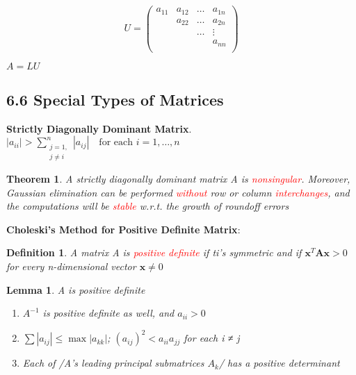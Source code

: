 \documentclass[11pt]{article}
\newtheorem{theorem}{Theorem}[section]
\newtheorem{definition}{Definition}[section]
\newtheorem{lemma}{Lemma}[section]
\begin{document}
\begin{equation*}
U=
\begin{pmatrix}
a_{11}&a_{12}&\dots&a_{1n}\\
&a_{22}&\dots&a_{2n}\\
&&\dots&\vdots\\
&&&a_{nn}\\
\end{pmatrix}
\end{equation*}

\(A=LU\)
\subsection{6.6 Special Types of Matrices}
\label{sec:orga3db150}
\textbf{Strictly Diagonally Dominant Matrix}.
\(|a_{ii}|>\displaystyle\sum_{\substack{j=1,\\j\neq i}}^n|a_{ij}| \quad
   \text{for each } i=1,\dots,n\)

\begin{theorem}
A strictly diagonally dominant matrix A is \textcolor{red}{nonsingular}. Moreover,
Gaussian elimination can be performed \textcolor{red}{without} row or column
\textcolor{red}{interchanges}, and the computations will be \textcolor{red}{stable}
w.r.t. the growth of roundoff errors
\end{theorem}

\textbf{Choleski's Method for Positive Definite Matrix}:
\begin{definition}
A matrix A is \textcolor{red}{positive definite} if ti's symmetric and if    
$ \mathbf{x}^T \mathbf{A} \mathbf{x}>0$ for every n-dimensional vector $ \mathbf{x}\neq 0$
\end{definition}

\begin{lemma}
A is positive definite
\begin{enumerate}
\item $A^{-1}$ is positive definite as well, and $a_{ii}>0$
\item $\sum|a_{ij}|\le\max|a_{kk}|$; $(a_{ij})^2<a_{ii}a_{jj}$ for each i ≠ j
\item Each of /A's leading principal submatrices $A_k$/ has a positive determinant
\end{enumerate}
\end{lemma}
\end{document}
